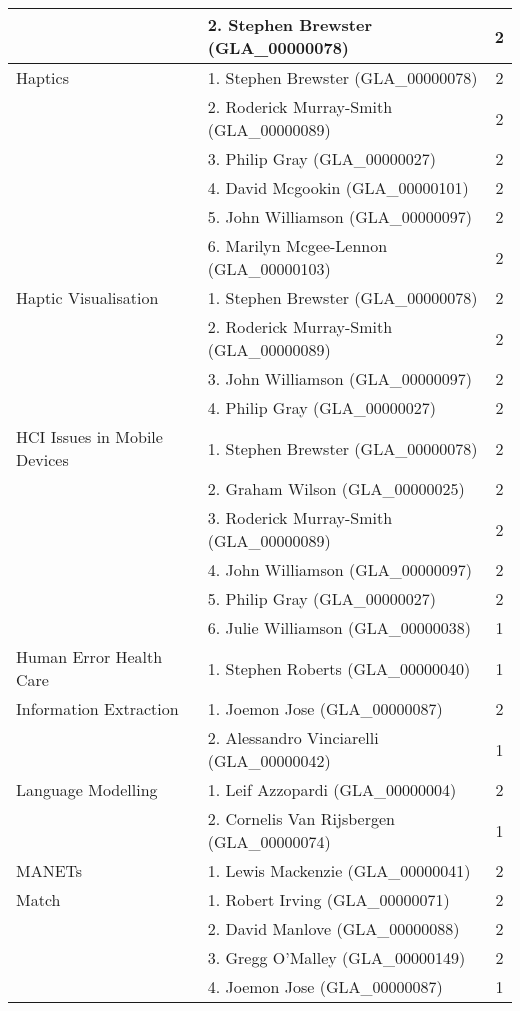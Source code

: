 \begin{longtable}{|l|l|c|}
\hline  & 2. Stephen Brewster (GLA\_00000078) & 2 \\ 
\hline Haptics & 1. Stephen Brewster (GLA\_00000078) & 2 \\ 
\hline  & 2. Roderick Murray-Smith (GLA\_00000089) & 2 \\ 
\hline  & 3. Philip Gray (GLA\_00000027) & 2 \\ 
\hline  & 4. David Mcgookin (GLA\_00000101) & 2 \\ 
\hline  & 5. John Williamson (GLA\_00000097) & 2 \\ 
\hline  & 6. Marilyn Mcgee-Lennon (GLA\_00000103) & 2 \\ 
\hline Haptic Visualisation & 1. Stephen Brewster (GLA\_00000078) & 2 \\ 
\hline  & 2. Roderick Murray-Smith (GLA\_00000089) & 2 \\ 
\hline  & 3. John Williamson (GLA\_00000097) & 2 \\ 
\hline  & 4. Philip Gray (GLA\_00000027) & 2 \\ 
\hline HCI Issues in Mobile Devices & 1. Stephen Brewster (GLA\_00000078) & 2 \\ 
\hline  & 2. Graham Wilson (GLA\_00000025) & 2 \\ 
\hline  & 3. Roderick Murray-Smith (GLA\_00000089) & 2 \\ 
\hline  & 4. John Williamson (GLA\_00000097) & 2 \\ 
\hline  & 5. Philip Gray (GLA\_00000027) & 2 \\ 
\hline  & 6. Julie Williamson (GLA\_00000038) & 1 \\ 
\hline Human Error Health Care & 1. Stephen Roberts (GLA\_00000040) & 1 \\ 
\hline Information Extraction & 1. Joemon Jose (GLA\_00000087) & 2 \\ 
\hline  & 2. Alessandro Vinciarelli (GLA\_00000042) & 1 \\ 
\hline Language Modelling & 1. Leif Azzopardi (GLA\_00000004) & 2 \\ 
\hline  & 2. Cornelis Van Rijsbergen (GLA\_00000074) & 1 \\ 
\hline MANETs & 1. Lewis Mackenzie (GLA\_00000041) & 2 \\ 
\hline Match & 1. Robert Irving (GLA\_00000071) & 2 \\ 
\hline  & 2. David Manlove (GLA\_00000088) & 2 \\ 
\hline  & 3. Gregg O'Malley (GLA\_00000149) & 2 \\ 
\hline  & 4. Joemon Jose (GLA\_00000087) & 1 \\ 

\end{longtable}
